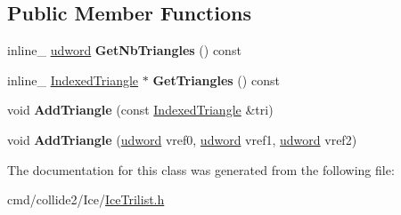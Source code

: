 \subsection*{Public Member Functions}
\begin{DoxyCompactItemize}
\item 
inline\+\_\+ \hyperlink{IceTypes_8h_a44c6f1920ba5551225fb534f9d1a1733}{udword} {\bfseries Get\+Nb\+Triangles} () const \hypertarget{classTriangleList_a6b7886829df695c13b006d5873040fe6}{}\label{classTriangleList_a6b7886829df695c13b006d5873040fe6}

\item 
inline\+\_\+ \hyperlink{classIndexedTriangle}{Indexed\+Triangle} $\ast$ {\bfseries Get\+Triangles} () const \hypertarget{classTriangleList_ae10212d8eafffbd8b2c0b1762a2892d1}{}\label{classTriangleList_ae10212d8eafffbd8b2c0b1762a2892d1}

\item 
void {\bfseries Add\+Triangle} (const \hyperlink{classIndexedTriangle}{Indexed\+Triangle} \&tri)\hypertarget{classTriangleList_a3fb434513c91f70ff3672a5265546ed2}{}\label{classTriangleList_a3fb434513c91f70ff3672a5265546ed2}

\item 
void {\bfseries Add\+Triangle} (\hyperlink{IceTypes_8h_a44c6f1920ba5551225fb534f9d1a1733}{udword} vref0, \hyperlink{IceTypes_8h_a44c6f1920ba5551225fb534f9d1a1733}{udword} vref1, \hyperlink{IceTypes_8h_a44c6f1920ba5551225fb534f9d1a1733}{udword} vref2)\hypertarget{classTriangleList_a31c95b8aabb23a054d814118a7a15c56}{}\label{classTriangleList_a31c95b8aabb23a054d814118a7a15c56}

\end{DoxyCompactItemize}


The documentation for this class was generated from the following file\+:\begin{DoxyCompactItemize}
\item 
cmd/collide2/\+Ice/\hyperlink{IceTrilist_8h}{Ice\+Trilist.\+h}\end{DoxyCompactItemize}
